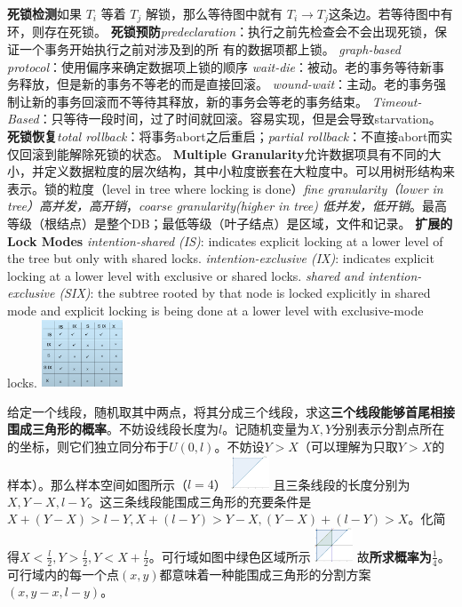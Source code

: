 \documentclass[]{article}
\begin{document}
\begin{multicols}{3}
\textbf{死锁检测}如果 $T_i$ 等着 $T_j$ 解锁，那么等待图中就有 $T_i \to T_j$这条边。若等待图中有环，则存在死锁。
\textbf{死锁预防}\textit{predeclaration}：执行之前先检查会不会出现死锁，保证一个事务开始执行之前对涉及到的所
有的数据项都上锁。
\textit{graph-based protocol}：使用偏序来确定数据项上锁的顺序
\textit{wait-die}：被动。老的事务等待新事务释放，但是新的事务不等老的而是直接回滚。
\textit{wound-wait}：主动。老的事务强制让新的事务回滚而不等待其释放，新的事务会等老的事务结束。
\textit{Timeout-Based}：只等待一段时间，过了时间就回滚。容易实现，但是会导致starvation。
\textbf{死锁恢复}\textit{total rollback}：将事务abort之后重启；\textit{partial rollback}：不直接abort而实仅回滚到能解除死锁的状态。
\textbf{Multiple Granularity}允许数据项具有不同的大小，并定义数据粒度的层次结构，其中小粒度嵌套在大粒度中。可以用树形结构来表示。锁的粒度（level in tree where locking is done）\textit{fine granularity（lower in tree）高并发，高开销}，\textit{coarse granularity(higher in tree) 低并发，低开销}。最高等级（根结点）是整个DB；最低等级（叶子结点）是区域，文件和记录。
\textbf{扩展的Lock Modes}
\textit{intention-shared (IS)}: indicates explicit locking at a lower level of the tree but only with shared locks.
\textit{intention-exclusive (IX)}: indicates explicit locking at a lower level with exclusive or shared locks.
\textit{shared and intention-exclusive (SIX)}: the subtree rooted by that node is locked explicitly in shared mode and explicit locking is being done at a lower level with exclusive-mode locks.
\includegraphics[height=20mm]{./img/lock.png}

给定一个线段，随机取其中两点，将其分成三个线段，求这\textbf{三个线段能够首尾相接围成三角形的概率}。不妨设线段长度为$l$。记随机变量为$X,Y$分别表示分割点所在的坐标，则它们独立同分布于$U(0,l)$。不妨设$Y > X$（可以理解为只取$Y>X$的样本）。那么样本空间如图所示（$l=4$）
\includegraphics[height=10mm]{./img/1.png}
且三条线段的长度分别为$X,Y-X, l-Y$。这三条线段能围成三角形的充要条件是$X + (Y-X) > l -Y, X + (l - Y) > Y - X, (Y - X) + (l - Y) > X$。化简得$X < \frac{l}{2}, Y > \frac{l}{2}, Y < X + \frac{l}{2}$。可行域如图中绿色区域所示
\includegraphics[height=10mm]{./img/2.png}
故\textbf{所求概率为$\frac{1}{4}$}。可行域内的每一个点$(x,y)$都意味着一种能围成三角形的分割方案$(x,y-x,l-y)$。


\end{multicols}
\end{document}
